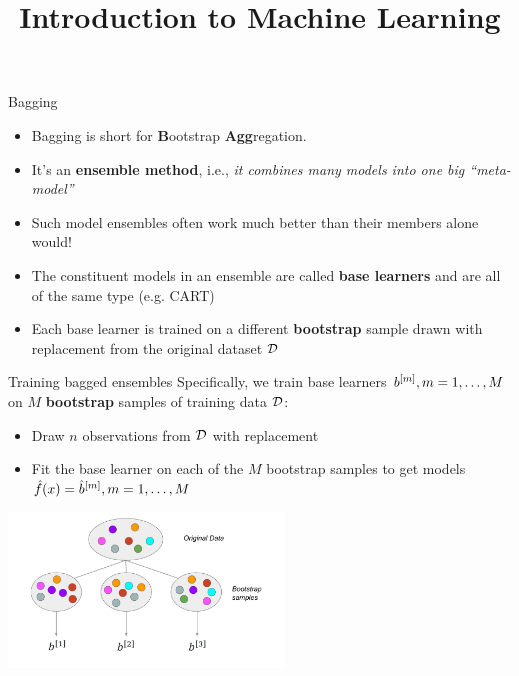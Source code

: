 \documentclass[11pt,compress,t,notes=noshow, xcolor=table]{beamer}
\title{Introduction to Machine Learning}
\institute{\href{https://compstat-lmu.github.io/lecture_i2ml/}{compstat-lmu.github.io/lecture\_i2ml}}
\date{}
\begin{document}
\sloppy


\begin{vbframe}{Bagging}

\begin{itemize}
  \item Bagging is short for \textbf{B}ootstrap \textbf{Agg}regation.
  \item It's an \textbf{ensemble method}, i.e., \textit{it combines many models into one big \enquote{meta-model}}
  \item Such model ensembles often work much better than their members alone would!
  \item The constituent models in an ensemble are called \textbf{base learners} and are all of the same type (e.g. CART)
  \item Each base learner is trained on a different \textbf{bootstrap} sample drawn with replacement from the original dataset $\mathcal{D}$
\end{itemize}

\end{vbframe}

\begin{vbframe}{Training bagged ensembles}
Specifically, we train base learners $b^{[m]}, m = 1, \dots, M$ on $M$ \textbf{bootstrap} samples of training data $\mathcal{D}$:
\begin{itemize}
  \item Draw $n$ observations from $\mathcal{D}$ with replacement
  \item Fit the base learner on each of the $M$ bootstrap samples to get models $\hat{f}(x) = \hat{b}^{[m]}, m = 1, \dots, M$
\end{itemize}

\begin{center}
\includegraphics[width=0.55\textwidth]{figure_man/bagging.pdf}
\end{center}

\end{vbframe}
\end{document}

